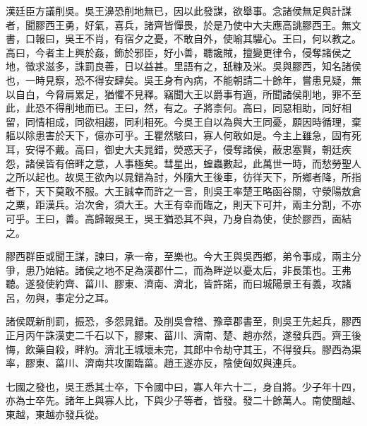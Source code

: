 漢廷臣方議削吳。吳王濞恐削地無已，因以此發謀，欲舉事。念諸侯無足與計謀者，聞膠西王勇，好氣，喜兵，諸齊皆憚畏，於是乃使中大夫應高誂膠西王。無文書，口報曰，吳王不肖，有宿夕之憂，不敢自外，使喻其驩心。王曰，何以教之。高曰，今者主上興於姦，飾於邪臣，好小善，聽讒賊，擅變更律令，侵奪諸侯之地，徵求滋多，誅罰良善，日以益甚。里語有之，舐糠及米。吳與膠西，知名諸侯也，一時見察，恐不得安肆矣。吳王身有內病，不能朝請二十餘年，嘗患見疑，無以自白，今脅肩累足，猶懼不見釋。竊聞大王以爵事有適，所聞諸侯削地，罪不至此，此恐不得削地而已。王曰，然，有之。子將柰何。高曰，同惡相助，同好相留，同情相成，同欲相趨，同利相死。今吳王自以為與大王同憂，願因時循理，棄軀以除患害於天下，億亦可乎。王瞿然駭曰，寡人何敢如是。今主上雖急，固有死耳，安得不戴。高曰，御史大夫晁錯，熒惑天子，侵奪諸侯，蔽忠塞賢，朝廷疾怨，諸侯皆有倍畔之意，人事極矣。彗星出，蝗蟲數起，此萬世一時，而愁勞聖人之所以起也。故吳王欲內以晁錯為討，外隨大王後車，彷徉天下，所鄉者降，所指者下，天下莫敢不服。大王誠幸而許之一言，則吳王率楚王略函谷關，守滎陽敖倉之粟，距漢兵。治次舍，須大王。大王有幸而臨之，則天下可并，兩主分割，不亦可乎。王曰，善。高歸報吳王，吳王猶恐其不與，乃身自為使，使於膠西，面結之。

膠西群臣或聞王謀，諫曰，承一帝，至樂也。今大王與吳西鄉，弟令事成，兩主分爭，患乃始結。諸侯之地不足為漢郡什二，而為畔逆以憂太后，非長策也。王弗聽。遂發使約齊、菑川、膠東、濟南、濟北，皆許諾，而曰城陽景王有義，攻諸呂，勿與，事定分之耳。

諸侯既新削罰，振恐，多怨晁錯。及削吳會稽、豫章郡書至，則吳王先起兵，膠西正月丙午誅漢吏二千石以下，膠東、菑川、濟南、楚、趙亦然，遂發兵西。齊王後悔，飲藥自殺，畔約。濟北王城壞未完，其郎中令劫守其王，不得發兵。膠西為渠率，膠東、菑川、濟南共攻圍臨菑。趙王遂亦反，陰使匈奴與連兵。

七國之發也，吳王悉其士卒，下令國中曰，寡人年六十二，身自將。少子年十四，亦為士卒先。諸年上與寡人比，下與少子等者，皆發。發二十餘萬人。南使閩越、東越，東越亦發兵從。

